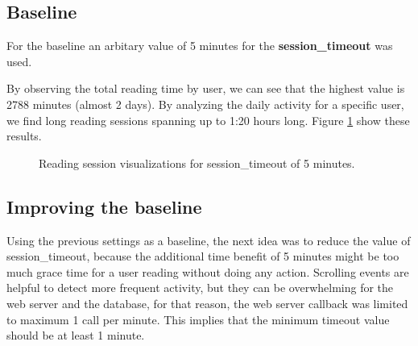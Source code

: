 \subsection{Baseline}
For the baseline an arbitary value of 5 minutes for the \textbf{session\_timeout} was used.

By observing the total reading time by user, we can see that the highest value is 2788 minutes (almost 2 days). By analyzing the daily activity for a specific user, we find long reading sessions spanning up to 1:20 hours long. Figure \ref{fig:visualizations_1st_iteration} show these results.

\begin{figure}[bth]
	\myfloatalign
	 \quad 
	 \quad
	\caption{Reading session visualizations for session\_timeout of 5 minutes.}\label{fig:visualizations_1st_iteration}
\end{figure}


\subsection{Improving the baseline}
Using the previous settings as a baseline, the next idea was to reduce the value of session\_timeout, because the additional time benefit of 5 minutes might be too much grace time for a user reading without doing any action. Scrolling events are helpful to detect more frequent activity, but they can be overwhelming for the web server and the database, for that reason, the web server callback was limited to maximum 1 call per minute. This implies that the minimum timeout value should be at least 1 minute.

